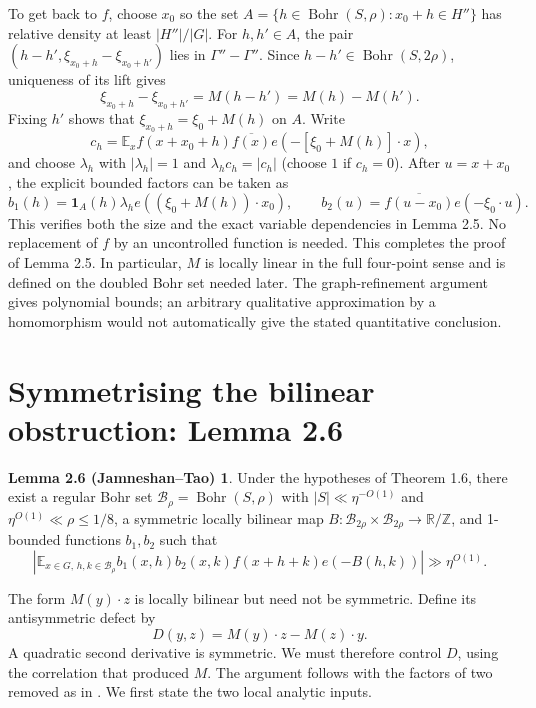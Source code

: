 \documentclass[11pt,a4paper]{article}
\newcommand{\E}{\mathbb E}
\newcommand{\T}{\mathbb R/\mathbb Z}
\newcommand{\Bohr}{\operatorname{Bohr}}
\newcommand{\bb}{\mathcal B}
\newcommand{\abs}[1]{\left|#1\right|}
\newcommand{\poly}{\eta^{O(1)}}
\newcommand{\ipoly}{\eta^{-O(1)}}
\newcommand{\JT}[1]{\cite[#1]{JT}}
\newcommand{\GT}[1]{\cite[#1]{GT}}
\theoremstyle{definition}
\newtheorem*{symmetrylemma}{Lemma 2.6 (Jamneshan--Tao)}
\numberwithin{equation}{section}
\begin{document}
To get back to $f$, choose $x_0$ so the set
$A=\{h\in\Bohr(S,\rho):x_0+h\in H''\}$ has relative density
at least $|H''|/|G|$. For $h,h'\in A$, the pair
$(h-h',\xi_{x_0+h}-\xi_{x_0+h'})$ lies in $\Gamma''-\Gamma''$.
Since $h-h'\in\Bohr(S,2\rho)$, uniqueness of its lift gives
\[
\xi_{x_0+h}-\xi_{x_0+h'}=M(h-h')=M(h)-M(h').
\]
Fixing $h'$ shows that $\xi_{x_0+h}=\xi_0+M(h)$ on $A$.
Write
\[c_h=\E_xf(x+x_0+h)\overline{f(x)}e(-[\xi_0+M(h)]\cdot x),\]
and choose $\lambda_h$ with $|\lambda_h|=1$ and
$\lambda_hc_h=|c_h|$ (choose $1$ if $c_h=0$). After $u=x+x_0$,
the explicit bounded factors can be taken as
\[
b_1(h)=\mathbf1_A(h)\lambda_h e((\xi_0+M(h))\cdot x_0),
\qquad b_2(u)=\overline{f(u-x_0)}e(-\xi_0\cdot u).
\]
This verifies both the size and the exact variable dependencies in
Lemma 2.5. No replacement of $f$ by an uncontrolled function is needed.
This completes the proof of Lemma 2.5. In particular, $M$ is locally
linear in the full four-point sense and is defined on the doubled Bohr
set needed later. The graph-refinement argument gives polynomial bounds;
an arbitrary qualitative approximation by a homomorphism would not
automatically give the stated quantitative conclusion.

\section{Symmetrising the bilinear obstruction: Lemma 2.6}\label{sec:symmetry}
\begin{symmetrylemma}
Under the hypotheses of Theorem 1.6, there exist a regular Bohr set
$\bb_\rho=\Bohr(S,\rho)$ with $|S|\ll\ipoly$ and
$\poly\ll\rho\leq1/8$, a symmetric locally bilinear map
$B:\bb_{2\rho}\times\bb_{2\rho}\to\T$, and 1-bounded functions
$b_1,b_2$ such that
\begin{equation}\label{eq:bilinear-correlation}
\abs{\E_{x\in G,\,h,k\in\bb_\rho}
b_1(x,h)b_2(x,k)f(x+h+k)e(-B(h,k))}\gg\poly.
\end{equation}
\end{symmetrylemma}
The form $M(y)\cdot z$ is locally bilinear but need not be symmetric.
Define its antisymmetric defect by
\[D(y,z)=M(y)\cdot z-M(z)\cdot y.\]
A quadratic second derivative is symmetric. We must therefore control
$D$, using the correlation that produced $M$. The argument follows
\GT{Lemma 9.4} with the factors of two removed as in
\JT{Lemma 2.6}. We first state the two local analytic inputs.
\end{document}
